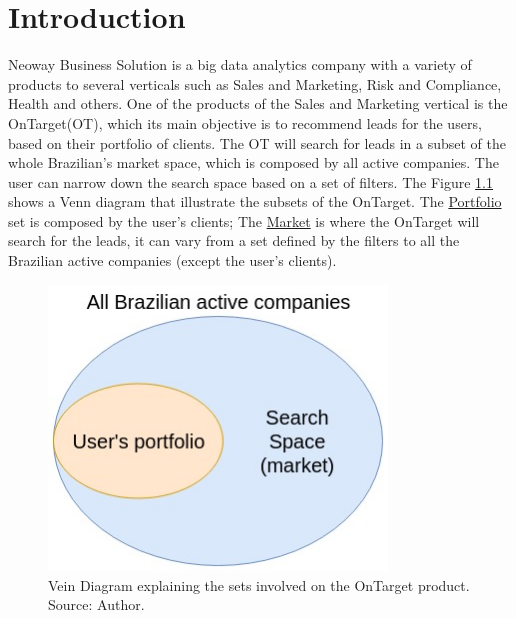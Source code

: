 \chapter{Introduction} \label{ch:introduction}

\fancyhead[ER]{\sffamily\footnotesize{\leftmark}}
\fancyhead[OL]{\sffamily\footnotesize{\rightmark}}

Neoway Business Solution is a big data analytics company with a variety of products to several verticals such as Sales and Marketing, Risk and Compliance, Health and others. One of the products of the Sales and Marketing vertical is the OnTarget(OT), which its main objective is to recommend leads for the users, based on their portfolio of clients. The OT will search for leads in a subset of the whole Brazilian's market space, which is composed by all active companies. The user can narrow down the search space based on a set of filters. The Figure \ref{fig:braz-comps-venn-diagram} shows a Venn diagram that illustrate the subsets of the OnTarget. The \underline{Portfolio} set is composed by the user's clients; The \underline{Market} is where the OnTarget will search for the leads, it can vary from a set defined by the filters to all the Brazilian active companies (except the user's clients).

\begin{figure}[h]
   \centering
   \includegraphics[width=9cm]{fig/int-brazil-comps-venn-diagram.jpg}
   \caption{Vein Diagram explaining the sets involved on the OnTarget product. Source: Author.}
   \label{fig:braz-comps-venn-diagram}
\end{figure}

